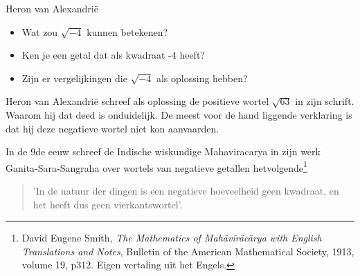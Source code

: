 \documentclass{ximera}
\begin{document}
\begin{exercise}{Heron van Alexandrië}
\begin{image}[0.8\textwidth]

        
        
    \end{image}
    

\end{exercise}



\begin{denkvraag*}{}
\begin{itemize}
    \item Wat zou \(\sqrt{-4}\) kunnen betekenen? 
    \item Ken je een getal dat als kwadraat -4 heeft? 
    \item Zijn er vergelijkingen die \(\sqrt{-4}\) als oplossing hebben? 
\end{itemize}
\end{denkvraag*}


Heron van Alexandrië schreef als oplossing de positieve wortel \(\sqrt{63}\) in zijn schrift. 
Waarom hij dat deed is onduidelijk.
De meest voor de hand liggende verklaring is dat hij deze negatieve wortel niet kon aanvaarden. 


In de 9de eeuw schreef de Indische wiskundige Mahaviracarya in zijn werk Ganita-Sara-Sangraha over wortels van negatieve getallen hetvolgende\footnote{
    David Eugene Smith, \textit{The Mathematics of Mahāvīrācārya with English Translations and Notes}, Bulletin of the American Mathematical Society, 1913, volume 19, p312. Eigen vertaling uit het Engels.} 

\begin{quote}
    'In de natuur der dingen is een negatieve hoeveelheid geen kwadraat, en het heeft dus geen vierkantswortel'.
\end{quote}
 
\end{document}
